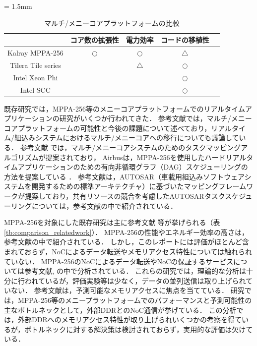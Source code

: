 \documentclass[submit,techrep]{ipsj_v2/UTF8/ipsj}
\begin{document}
\begin{table}[t]
  \caption{\label{tb:comparison_manycore}
    マルチ/メニーコアプラットフォームの比較}
  \centering
  \scriptsize	                    %
  \tabcolsep = 1.5mm              %
  \begin{tabular}{c|cccc}
    \hline
    & コア数の拡張性 & 電力効率  & コードの移植性 & \\
    \hline
    \hline
    Kalray MPPA-256 \cite{de2014time} & \(\bigcirc\) & \(\bigcirc\) & \(\triangle\) & \\
    Tilera Tile series \cite{bell2008tile64} &  & \(\triangle\) & \(\bigcirc\) & \\
    Intel Xeon Phi \cite{chrysos2014intel} \cite{chrysos2012intel} &  &  & \(\bigcirc\) & \\
    Intel SCC \cite{baron2010single} &  &  & \(\bigcirc\) & \\
    \hline
  \end{tabular}
\end{table}

既存研究では，MPPA-256等のメニーコアプラットフォームでのリアルタイムアプリケーションの研究がいくつか行われてきた．
参考文献\cite{saidi2015shift}では，マルチ/メニーコアプラットフォームの可能性と今後の課題について述べており，リアルタイム/組込みシステムにおけるマルチ/メニーコアへの移行についても議論している．
参考文献\cite{carle2014static} \cite{faragardi2014communication} \cite{perret2016mapping}では，マルチ/メニーコアシステムのためのタスクマッピングアルゴリズムが提案されており，
Airbusは，MPPA-256を使用したハードリアルタイムアプリケーションのための有向非循環グラフ（DAG）スケジューリングの方法を提案している \cite{perret2016mapping}．
参考文献\cite{faragardi2014communication}は，AUTOSAR（車載用組込みソフトウェアシステムを開発するための標準アーキテクチャ\cite{furst2009autosar}）に基づいたマッピングフレームワークが提案しており，共有リソースの競合を考慮したAUTOSARタスクスケジューリングについては，参考文献\cite{becker2016contention}の中で紹介されている．

MPPA-256を対象にした既存研究は主に参考文献\cite{deDinechin2014GSN} \cite{denet2017work} \cite{kanter2015kalray} \cite{perret2016predictable} 等が挙げられる（表\ref{tb:comparison_relatedwork}）．
MPPA-256の性能やエネルギー効率の高さは，参考文献\cite{kanter2015kalray}の中で紹介されている．
しかし，このレポートには評価がほとんど含まれておらず，NoCによるデータ転送やメモリアクセス特性については触れられていない．
MPPA-256のNoCによるデータ転送やNoCの保証するサービスについては参考文献\cite{deDinechin2014GSN}, \cite{denet2017work}の中で分析されている．
これらの研究では，理論的な分析は十分に行われているが，評価実験等は少なく，データの並列送信は取り上げられていない．
参考文献\cite{perret2016predictable}は，予測可能なメモリアクセスに焦点を当てている．
研究では，MPPA-256等のメニープラットフォームでのパフォーマンスと予測可能性の主なボトルネックとして，外部DDRとのNoC通信が挙げている．
この分析では，外部DDRへのメモリアクセス特性が取り上げられいくつかの考察を得ているが，ボトルネックに対する解決策は検討されておらず，実用的な評価は欠けている．
\end{document}
